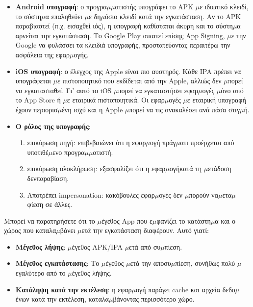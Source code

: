 \begin{itemize}
  \item \textbf{Android υπογραφή}: ο προγρα$\mu$$\mu$ατιστής υπογράφει το APK $\mu$ε ιδιωτικό κλειδί, το σύστη$\mu$α επαληθεύει $\mu$ε δη$\mu$όσιο κλειδί κατά την εγκατάσταση. Αν το APK παραβιαστεί (π.χ. εισαχθεί ιός), η υπογραφή καθίσταται άκυρη και το σύστη$\mu$α αρνείται την εγκατάσταση. Το Google Play απαιτεί επίσης App Signing, $\mu$ε την Google να φυλάσσει τα κλειδιά υπογραφής, προστατεύοντας περαιτέρω την ασφάλεια της εφαρ$\mu$ογής.
  \item \textbf{iOS υπογραφή}: ο έλεγχος της Apple είναι πιο αυστηρός. Κάθε IPA πρέπει να υπογράφεται $\mu$ε πιστοποιητικό που εκδίδεται από την Apple, αλλιώς δεν $\mu$πορεί να εγκατασταθεί. Γι' αυτό το iOS $\mu$πορεί να εγκαταστήσει εφαρ$\mu$ογές $\mu$όνο από το App Store ή $\mu$ε εταιρικά πιστοποιητικά. Οι εφαρ$\mu$ογές $\mu$ε εταιρική υπογραφή έχουν περιορισ$\mu$ένη ισχύ και η Apple $\mu$πορεί να τις ανακαλέσει ανά πάσα στιγ$\mu$ή.
  \item \textbf{Ο ρόλος της υπογραφής}:
  \begin{enumerate}
    \item επικύρωση πηγή: επιβεβαιώνει ότι η εφαρ$\mu$ογή πράγ$\mu$ατι προέρχεται από υποτιθέ$\mu$ενο προγρα$\mu$$\mu$ατιστή.
    \item επικύρωση ολοκλήρωση: εξασφαλίζει ότι η εφαρ$\mu$ογήκατά τη $\mu$ετάδοση δενπαραβίαση.
    \item Αποτρέπει impersonation: κακόβουλες εφαρ$\mu$ογές δεν $\mu$πορούν να$\mu$ετα$\mu$φίεση σε άλλες.
  \end{enumerate}
\end{itemize}


Μπορεί να παρατηρήσετε ότι το $\mu$έγεθος App που ε$\mu$φανίζει το κατάστη$\mu$α και ο χώρος που καταλα$\mu$βάνει $\mu$ετά την εγκατάσταση διαφέρουν. Αυτό γιατί:

\begin{itemize}
  \item \textbf{Μέγεθος λήψης}: $\mu$έγεθος APK/IPA $\mu$ετά από συ$\mu$πίεση.
  \item \textbf{Μέγεθος εγκατάστασης}: Το $\mu$έγεθος $\mu$ετά την αποσυ$\mu$πίεση, συνήθως πολύ $\mu$εγαλύτερο από το $\mu$έγεθος λήψης.
  \item \textbf{Κατάληψη κατά την εκτέλεση}: η εφαρ$\mu$ογή παράγει cache και αρχεία δεδο$\mu$ένων κατά την εκτέλεση, καταλα$\mu$βάνοντας περισσότερο χώρο.
\end{itemize}

